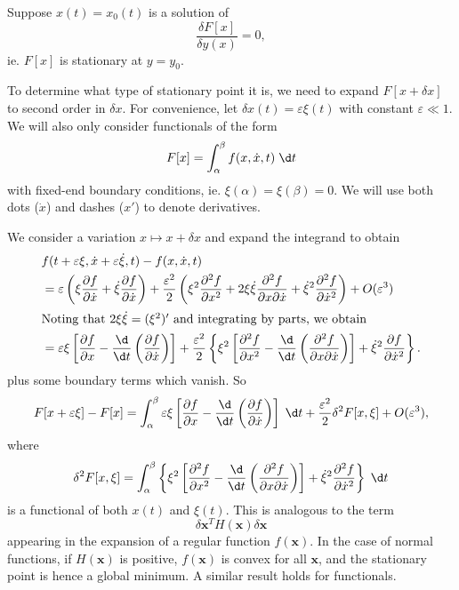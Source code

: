 \documentclass[a4paper]{article}
\begin{document}
Suppose $x(t) = x_0(t)$ is a solution of
\[
  \frac{\delta F[x]}{\delta y(x)} = 0,
\]
ie. $F[x]$ is stationary at $y = y_0$.

To determine what type of stationary point it is, we need to expand $F[x + \delta x]$ to second order in $\delta x$. For convenience, let $\delta x(t) = \varepsilon \xi(t)$ with constant $\varepsilon \ll 1$. We will also only consider functionals of the form
\[
  F[x] = \int_\alpha^\beta f(x, \dot{x}, t)\;\d t
\]
with fixed-end boundary conditions, ie. $\xi(\alpha) = \xi(\beta) = 0$. We will use both dots ($\dot{x}$) and dashes ($x'$) to denote derivatives.

We consider a variation $x \mapsto x + \delta x$ and expand the integrand to obtain
\begin{align*}
  &f(t + \varepsilon \xi, \dot{x} + \varepsilon \dot{\xi}, t) - f(x, \dot{x}, t)\\
  &= \varepsilon \left(\xi \frac{\partial f}{\partial \dot{x}} + \dot{\xi}\frac{\partial f}{\partial \dot{x}}\right) + \frac{\varepsilon^2}{2}\left(\xi^2 \frac{\partial^2 f}{\partial x^2} + 2\xi\dot{\xi} \frac{\partial^2 f}{\partial x \partial \dot{x}} + \dot{\xi}^2 \frac{\partial^2 f}{\partial \dot{x}^2}\right) + O(\varepsilon^3)\\
  \intertext{Noting that $2\xi \dot{\xi} = (\xi^2)'$ and integrating by parts, we obtain}
  &= \varepsilon \xi\left[\frac{\partial f}{\partial x} - \frac{\d}{\d t}\left(\frac{\partial f}{\partial \dot{x}}\right)\right] + \frac{\varepsilon^2}{2}\left\{\xi^2\left[\frac{\partial^2 f}{\partial x^2} - \frac{\d}{\d t}\left(\frac{\partial^2 f}{\partial x\partial \dot{x}}\right)\right] + \dot{\xi}^2 \frac{\partial f}{\partial \dot{x}^2}\right\}.
\end{align*}
plus some boundary terms which vanish. So
\[
  F[x + \varepsilon \xi] - F[x] = \int_\alpha^\beta\varepsilon\xi\left[\frac{\partial f}{\partial x} - \frac{\d}{\d t}\left(\frac{\partial f}{\partial \dot{x}}\right)\right]\;\d t + \frac{\varepsilon^2}{2}\delta^2 F[x, \xi] + O(\varepsilon^3),
\]
where
\[
  \delta^2 F[x, \xi] = \int_\alpha^\beta \left\{\xi^2 \left[\frac{\partial^2 f}{\partial x^2} - \frac{\d}{\d t}\left(\frac{\partial^2 f}{\partial x \partial \dot{x}}\right)\right] + \dot{\xi}^2 \frac{\partial^2 f}{\partial \dot{x}^2}\right\}\;\d t
\]
is a functional of both $x(t)$ and $\xi(t)$. This is analogous to the term
\[
  \delta \mathbf{x}^T H(\mathbf{x})\delta \mathbf{x}
\]
appearing in the expansion of a regular function $f(\mathbf{x})$. In the case of normal functions, if $H(\mathbf{x})$ is positive, $f(\mathbf{x})$ is convex for all $\mathbf{x}$, and the stationary point is hence a global minimum. A similar result holds for functionals.
\end{document}
